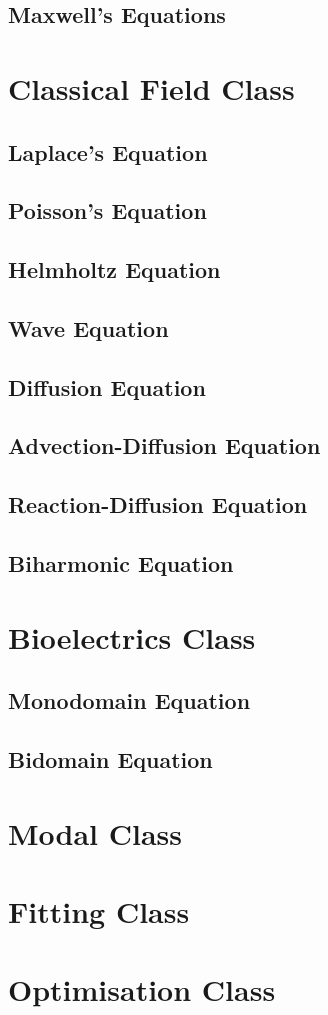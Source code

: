 \subsection{Maxwell's Equations}

\section{Classical Field Class}

\subsection{Laplace's Equation}

\subsection{Poisson's Equation}

\subsection{Helmholtz Equation}

\subsection{Wave Equation}

\subsection{Diffusion Equation}

\subsection{Advection-Diffusion Equation}

\subsection{Reaction-Diffusion Equation}

\subsection{Biharmonic Equation}

\section{Bioelectrics Class}

\subsection{Monodomain Equation}

\subsection{Bidomain Equation}
\section{Modal Class}

\section{Fitting Class}

\section{Optimisation Class}
